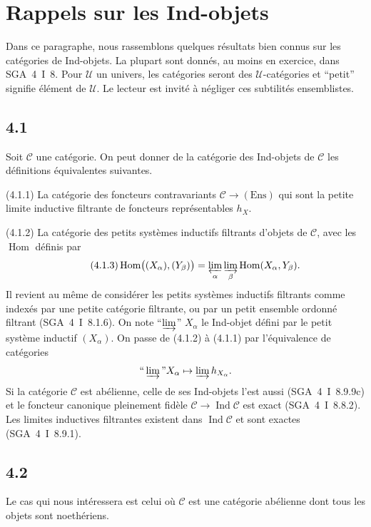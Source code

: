 \documentclass[12pt,a4paper]{article}
\theoremstyle{plain}
\theoremstyle{definition}
\theoremstyle{remark}
\DeclareMathOperator{\Hom}{Hom}
\DeclareMathOperator{\Ind}{Ind}
\begin{document}
\section{Rappels sur les Ind-objets}
\label{sec:4}

Dans ce paragraphe, nous rassemblons quelques résultats bien connus sur les catégories de Ind-objets. La plupart sont donnés, au moins en exercice, dans SGA~4~I~8. Pour $\mathcal{U}$ un univers, les catégories seront des $\mathcal{U}$-catégories et ``petit'' signifie élément de $\mathcal{U}$. Le lecteur est invité à négliger ces subtilités ensemblistes.

\subsection*{4.1}

Soit $\mathcal{C}$ une catégorie. On peut donner de la catégorie des Ind-objets de $\mathcal{C}$ les définitions équivalentes suivantes.

(4.1.1) La catégorie des foncteurs contravariants $\mathcal{C}\to(\mathrm{Ens})$ qui sont la petite limite inductive filtrante de foncteurs représentables $h_X$.

(4.1.2) La catégorie des petits systèmes inductifs filtrants d'objets de $\mathcal{C}$, avec les $\Hom$ définis par
\begin{equation*}\tag{4.1.3}
\Hom\bigl((X_\alpha),(Y_\beta)\bigr) = 
\varprojlim_\alpha 
\varinjlim_\beta 
\Hom(X_\alpha, Y_\beta).
\end{equation*}
Il revient au même de considérer les petits systèmes inductifs filtrants comme indexés par une petite catégorie filtrante, ou par un petit ensemble ordonné filtrant (SGA~4~I~8.1.6). On note ``$\varinjlim$'' $X_\alpha$ le Ind-objet défini par le petit système inductif $(X_\alpha)$. On passe de (4.1.2) à (4.1.1) par l'équivalence de catégories
\[
\text{``}\varinjlim\text{''} X_\alpha 
\mapsto 
\varinjlim h_{X_\alpha}.
\]
Si la catégorie $\mathcal{C}$ est abélienne, celle de ses Ind-objets l'est aussi (SGA~4~I~8.9.9c) et le foncteur canonique pleinement fidèle $\mathcal{C} 
\to 
\Ind\mathcal{C}$ est exact (SGA~4~I~8.8.2). Les limites inductives filtrantes existent dans $\Ind\mathcal{C}$ et sont exactes (SGA~4~I~8.9.1).

\subsection*{4.2}

Le cas qui nous intéressera est celui où $\mathcal{C}$ est une catégorie abélienne dont tous les objets sont noethériens.
\end{document}
